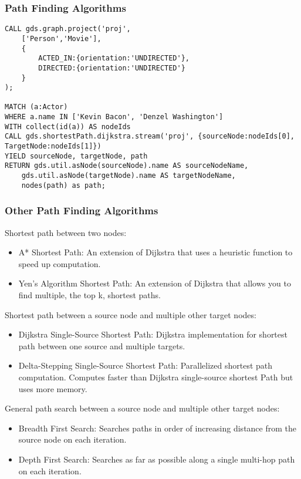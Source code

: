 \begin{frame}[fragile]\frametitle{Path Finding Algorithms}

\begin{lstlisting}
CALL gds.graph.project('proj',
    ['Person','Movie'],
    {
        ACTED_IN:{orientation:'UNDIRECTED'},
        DIRECTED:{orientation:'UNDIRECTED'}
    }
);

MATCH (a:Actor)
WHERE a.name IN ['Kevin Bacon', 'Denzel Washington']
WITH collect(id(a)) AS nodeIds
CALL gds.shortestPath.dijkstra.stream('proj', {sourceNode:nodeIds[0], TargetNode:nodeIds[1]})
YIELD sourceNode, targetNode, path
RETURN gds.util.asNode(sourceNode).name AS sourceNodeName,
    gds.util.asNode(targetNode).name AS targetNodeName,
    nodes(path) as path;
\end{lstlisting}


\end{frame}

\begin{frame}[fragile]\frametitle{Other Path Finding Algorithms}

 Shortest path between two nodes:
\begin{itemize}
\item A* Shortest Path: An extension of Dijkstra that uses a heuristic function to speed up computation.
\item Yen’s Algorithm Shortest Path: An extension of Dijkstra that allows you to find multiple, the top k, shortest paths.
\end{itemize}

Shortest path between a source node and multiple other target nodes:

\begin{itemize}
\item Dijkstra Single-Source Shortest Path: Dijkstra implementation for shortest path between one source and multiple targets.
\item Delta-Stepping Single-Source Shortest Path: Parallelized shortest path computation. Computes faster than Dijkstra single-source shortest Path but uses more memory.
\end{itemize}

General path search between a source node and multiple other target nodes:
\begin{itemize}

\item Breadth First Search: Searches paths in order of increasing distance from the source node on each iteration.
\item Depth First Search: Searches as far as possible along a single multi-hop path on each iteration.
\end{itemize}
\end{frame}


